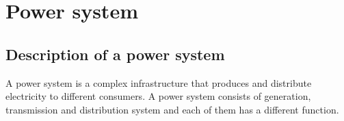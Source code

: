 \section{Power system}
\subsection{Description of a power system}
A power system is a complex infrastructure that produces and distribute electricity to different consumers. A power system consists of generation, transmission and distribution system and each of them has a different function. \\


